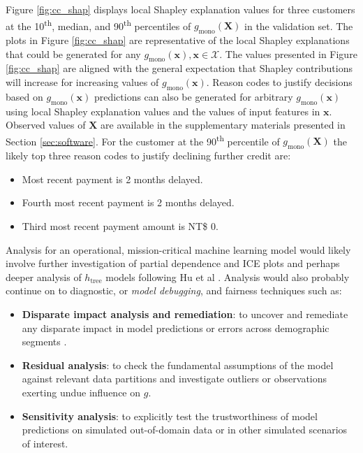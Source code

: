 \documentclass[sigconf, review]{acmart}
\begin{document}
Figure \ref{fig:cc_shap} displays local Shapley explanation values for three customers at the 10\textsuperscript{th}, median, and 90\textsuperscript{th} percentiles of $g_{\text{mono}}(\mathbf{X})$ in the validation set. The plots in Figure \ref{fig:cc_shap} are representative of the local Shapley explanations that could be generated for any $g_{\text{mono}}(\mathbf{x}), \mathbf{x} \in \mathcal{X}$. The values presented in Figure \ref{fig:cc_shap} are aligned with the general expectation that Shapley contributions will increase for increasing values of $g_{\text{mono}}(\mathbf{x})$. Reason codes to justify decisions based on $g_{\text{mono}}(\mathbf{x})$ predictions can also be generated for arbitrary $g_{\text{mono}}(\mathbf{x})$ using local Shapley explanation values and the values of input features in $\mathbf{x}$. 
Observed values of $\mathbf{X}$ are available in the supplementary materials presented in Section \ref{sec:software}. For the customer at the 90\textsuperscript{th} percentile of $g_{\text{mono}}(\mathbf{X})$ the likely top three reason codes to justify declining further credit are:

\begin{itemize}

\item Most recent payment is 2 months delayed.
\item Fourth most recent payment is 2 months delayed.
\item Third most recent payment amount is NT\$ 0.

\end{itemize} 

Analysis for an operational, mission-critical machine learning model would likely involve further investigation of partial dependence and ICE plots and perhaps deeper analysis of $h_{\text{tree}}$ models following Hu et al \cite{lime-sup}. Analysis would also probably continue on to diagnostic, or \textit{model debugging}, and fairness techniques such as:

\begin{itemize}

\item \textbf{Disparate impact analysis and remediation}: to uncover and remediate any disparate impact in model predictions or errors across demographic segments \cite{feldman2015certifying}.
\item \textbf{Residual analysis}: to check the fundamental assumptions of the model against relevant data partitions and investigate outliers or observations exerting undue influence on $g$. 
\item \textbf{Sensitivity analysis}: to explicitly test the trustworthiness of model predictions on simulated out-of-domain data or in other simulated scenarios of interest.  

\end{itemize} 
\end{document}
